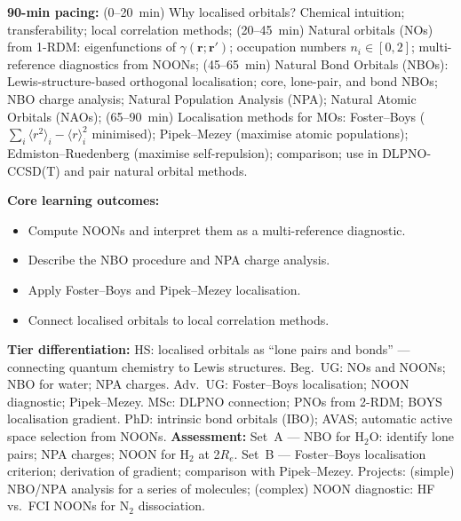 \documentclass[11pt,a4paper]{article}
\begin{document}
\begin{tcolorbox}[chembox, title={Module~III.2 --- Lecture L12: Natural and Localised Orbitals}]
\textbf{90-min pacing:} (0--20~min) Why localised orbitals? Chemical intuition; transferability; local correlation methods; (20--45~min) Natural orbitals (NOs) from 1-RDM: eigenfunctions of $\gamma(\mathbf{r};\mathbf{r}')$; occupation numbers $n_i\in[0,2]$; multi-reference diagnostics from NOONs; (45--65~min) Natural Bond Orbitals (NBOs): Lewis-structure-based orthogonal localisation; core, lone-pair, and bond NBOs; NBO charge analysis; Natural Population Analysis (NPA); Natural Atomic Orbitals (NAOs); (65--90~min) Localisation methods for MOs: Foster--Boys ($\sum_i\langle r^2\rangle_i - \langle r\rangle_i^2$ minimised); Pipek--Mezey (maximise atomic populations); Edmiston--Ruedenberg (maximise self-repulsion); comparison; use in DLPNO-CCSD(T) and pair natural orbital methods.

\medskip\textbf{Core learning outcomes:}
\begin{itemize}[leftmargin=1.4em,topsep=2pt,itemsep=1pt]
  \item Compute NOONs and interpret them as a multi-reference diagnostic.
  \item Describe the NBO procedure and NPA charge analysis.
  \item Apply Foster--Boys and Pipek--Mezey localisation.
  \item Connect localised orbitals to local correlation methods.
\end{itemize}
\medskip\textbf{Tier differentiation:}
HS: localised orbitals as ``lone pairs and bonds'' --- connecting quantum chemistry to Lewis structures.
Beg.\ UG: NOs and NOONs; NBO for water; NPA charges.
Adv.\ UG: Foster--Boys localisation; NOON diagnostic; Pipek--Mezey.
MSc: DLPNO connection; PNOs from 2-RDM; BOYS localisation gradient.
PhD: intrinsic bond orbitals (IBO); AVAS; automatic active space selection from NOONs.
\medskip\textbf{Assessment:}
Set~A --- NBO for H$_2$O: identify lone pairs; NPA charges; NOON for H$_2$ at 2$R_e$.
Set~B --- Foster--Boys localisation criterion; derivation of gradient; comparison with Pipek--Mezey.
Projects: (simple) NBO/NPA analysis for a series of molecules; (complex) NOON diagnostic: HF vs.\ FCI NOONs for N$_2$ dissociation.
\end{tcolorbox}

\medskip
\end{document}
